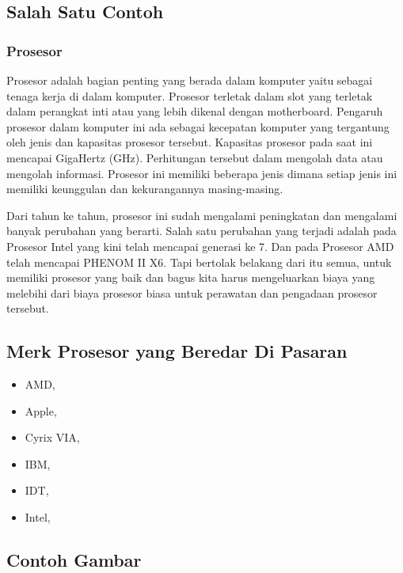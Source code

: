 \subsection{Salah Satu Contoh}

\subsubsection{Prosesor}
Prosesor adalah bagian penting yang berada dalam komputer yaitu sebagai tenaga kerja di dalam komputer. Prosesor terletak dalam slot
yang terletak dalam perangkat inti atau yang lebih dikenal dengan motherboard. Pengaruh prosesor dalam komputer ini ada sebagai kecepatan
komputer yang tergantung oleh jenis dan kapasitas prosesor tersebut. Kapasitas prosesor pada saat ini mencapai GigaHertz (GHz).
Perhitungan tersebut dalam mengolah data atau mengolah informasi. Prosesor ini memiliki beberapa jenis dimana setiap jenis ini memiliki 
keunggulan dan kekurangannya masing-masing.

Dari tahun ke tahun, prosesor ini sudah mengalami peningkatan dan mengalami banyak perubahan yang berarti. Salah satu perubahan yang 
terjadi adalah pada Prosesor Intel yang kini telah mencapai generasi ke 7. Dan pada Prosesor AMD telah mencapai PHENOM II X6. Tapi
bertolak belakang dari itu semua, untuk memiliki prosesor yang baik dan bagus kita harus mengeluarkan biaya yang melebihi dari biaya
prosesor biasa untuk perawatan dan pengadaan prosesor tersebut.

\subsection{Merk Prosesor yang Beredar Di Pasaran}
\begin{itemize}	
	\item AMD,
	\item Apple,
	\item Cyrix VIA,
	\item IBM,
	\item IDT,
	\item Intel,
\end{itemize}

\subsection{Contoh Gambar}

